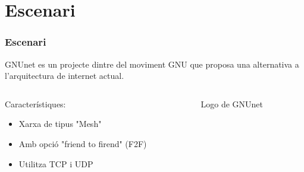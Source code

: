 \section{Escenari}

\begin{frame}
  \frametitle{Escenari}

  GNUnet es un projecte dintre del moviment GNU que proposa una alternativa a l'arquitectura de internet actual.
  \\
  \begin{columns}
    \begin{column}{0.55\textwidth}
      Característiques:
      \begin{itemize}
        \item<1-> Xarxa de tipus "Mesh"
        \item<2-> Amb opció "friend to firend" (F2F)
        \item<3-> Utilitza TCP i UDP
      \end{itemize}
    \end{column}
    \begin{column}{0.45\textwidth}
      \begin{figure}[htbp!]
        \begin{center}
          \def\svgwidth{0.50\columnwidth}
          
          \caption{Logo de GNUnet}
        \end{center}
      \end{figure}
    \end{column}
  \end{columns}

  \end{frame}

